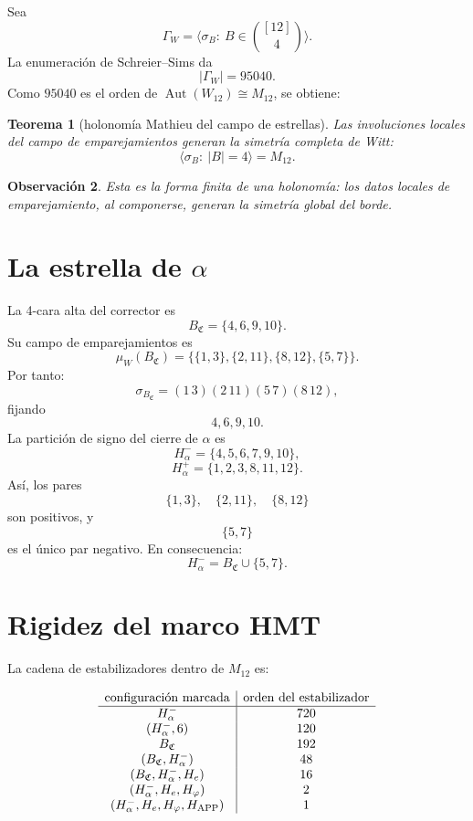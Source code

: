\documentclass[11pt,a4paper]{article}
\newtheorem{teorema}{Teorema}
\newtheorem{observacion}[teorema]{Observación}
\newcommand{\BC}{B_{\mathfrak C}}
\newcommand{\Halpha}{H_\alpha^-}
\newcommand{\Hplus}{H_\alpha^+}
\newcommand{\He}{H_e}
\newcommand{\Hphi}{H_\varphi}
\newcommand{\Happ}{H_{\rm APP}}
\begin{document}
Sea
\[
\Gamma_W=\langle \sigma_B:\ B\in\binom{[12]}4\rangle.
\]
La enumeración de Schreier--Sims da
\[
|\Gamma_W|=95040.
\]
Como \(95040\) es el orden de \(\operatorname{Aut}(W_{12})\cong M_{12}\), se obtiene:

\begin{teorema}[holonomía Mathieu del campo de estrellas]
Las involuciones locales del campo de emparejamientos generan la simetría completa de Witt:
\[
\boxed{
\langle \sigma_B:\ |B|=4\rangle=M_{12}.
}
\]
\end{teorema}

\begin{observacion}
Esta es la forma finita de una holonomía: los datos locales de emparejamiento, al componerse, generan la simetría global del borde.
\end{observacion}

\section{La estrella de \(\alpha\)}

La 4-cara alta del corrector es
\[
\BC=\{4,6,9,10\}.
\]
Su campo de emparejamientos es
\[
\mu_W(\BC)=
\{\{1,3\},\{2,11\},\{8,12\},\{5,7\}\}.
\]
Por tanto:
\[
\sigma_{\BC}=(1\,3)(2\,11)(5\,7)(8\,12),
\]
fijando
\[
4,6,9,10.
\]
La partición de signo del cierre de \(\alpha\) es
\[
\Halpha=\{4,5,6,7,9,10\},
\]
\[
\Hplus=\{1,2,3,8,11,12\}.
\]
Así, los pares
\[
\{1,3\},\quad \{2,11\},\quad \{8,12\}
\]
son positivos, y
\[
\{5,7\}
\]
es el único par negativo. En consecuencia:
\[
\Halpha=\BC\cup\{5,7\}.
\]

\section{Rigidez del marco HMT}

La cadena de estabilizadores dentro de \(M_{12}\) es:

\[
\begin{array}{c|c}
\text{configuración marcada} & \text{orden del estabilizador}\\
\hline
\Halpha & 720\\
(\Halpha,6) & 120\\
\BC & 192\\
(\BC,\Halpha) & 48\\
(\BC,\Halpha,\He) & 16\\
(\Halpha,\He,\Hphi) & 2\\
(\Halpha,\He,\Hphi,\Happ) & 1
\end{array}
\]
\end{document}
